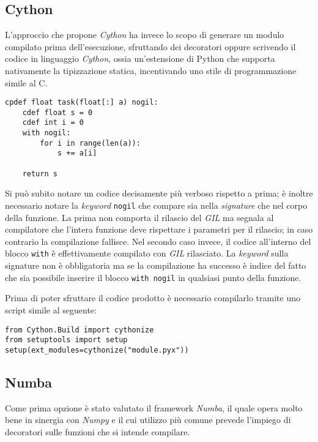 \subsection*{Cython}

L'approccio che propone \textit{Cython} ha invece lo scopo di generare un modulo
compilato prima dell'esecuzione, sfruttando dei decoratori oppure scrivendo il
codice in linguaggio \textit{Cython}, ossia un'estensione di Python che supporta
nativamente la tipizzazione statica, incentivando uno stile di programmazione
simile al C.

\begin{lstlisting}[caption={Esempio utilizzo Cython}]
cpdef float task(float[:] a) nogil:
	cdef float s = 0
	cdef int i = 0
	with nogil:
		for i in range(len(a)):
			s += a[i]

	return s
\end{lstlisting}

Si può subito notare un codice decisamente più verboso rispetto a prima;
è inoltre necessario notare la \textit{keyword} \verb|nogil| che compare sia
nella \textit{signature} che nel corpo della funzione. La prima non comporta il
rilascio del \textit{GIL} ma segnala al compilatore che l'intera funzione deve
rispettare i parametri per il rilascio; in caso contrario la compilazione
fallisce. Nel secondo caso invece, il codice all'interno del blocco \verb|with|
è effettivamente compilato con \textit{GIL} rilasciato. La \textit{keyword}
sulla signature non è obbligatoria ma se la compilazione ha successo è indice
del fatto che sia possibile inserire il blocco \verb|with nogil| in qualsiasi
punto della funzione.

Prima di poter sfruttare il codice prodotto è necessario compilarlo tramite
uno script simile al seguente:

\begin{lstlisting}[caption={Script di compilazione Cython}]
from Cython.Build import cythonize
from setuptools import setup
setup(ext_modules=cythonize("module.pyx"))
\end{lstlisting}

\subsection*{Numba}

Come prima opzione è stato valutato il framework \textit{Numba}, il quale opera
molto bene in sinergia con \textit{Numpy} e il cui utilizzo più comune prevede
l'impiego di decoratori sulle funzioni che si intende compilare.

